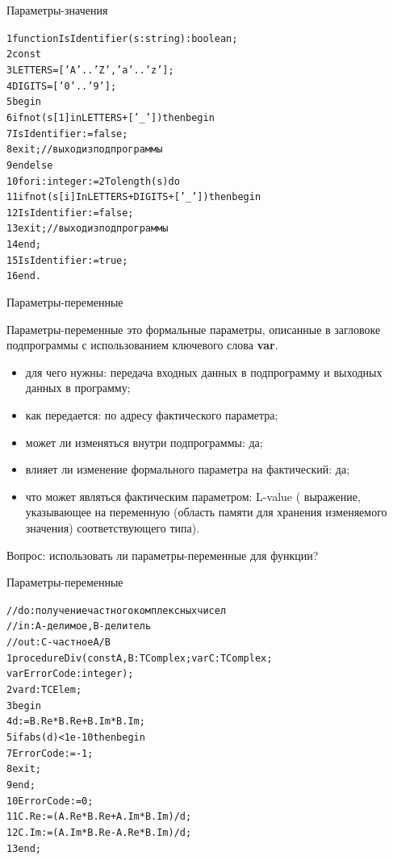 \documentclass{beamer}
\begin{document}
\begin{frame}[fragile]{Параметры-значения}
\begin{alltt}
1 function IsIdentifier(s: string): boolean;
2 const 
3   LETTERS = ['A'..'Z', 'a'..'z'];
4   DIGITS = ['0'..'9'];
5 begin
6   if not (s[1] in LETTERS + ['_']) then begin
7     IsIdentifier := false;
8     exit; //выход из подпрограммы
9   end else	
10   for i: integer := 2 To length(s) do
11     if not (s[i] In LETTERS + DIGITS + ['_']) then begin
12        IsIdentifier := false;
13        exit; //выход из подпрограммы
14     end;
15   IsIdentifier := true;
16 end.
\end{alltt}
\end{frame}

\begin{frame}[fragile]{Параметры-переменные}
\begin{block}{Параметры-переменные}
это формальные параметры, описанные в загловоке подпрограммы с использованием ключевого слова \textbf{var}.
\end{block}
\begin{itemize}
\item для чего нужны: передача входных данных в подпрограмму и выходных данных в программу;
\item как передается: по адресу фактического параметра;
\item может ли изменяться внутри подпрограммы: да;
\item влияет ли изменение формального параметра на фактический: да;
\item что может являться фактическим параметром: L-value ( выражение, указывающее на переменную (область памяти для хранения изменяемого значения) соответствующего типа).
\end{itemize}
Вопрос: использовать ли параметры-переменные для функции?
\end{frame}

\begin{frame}[fragile]{Параметры-переменные}
\begin{alltt}
//do: получение частного комплексных чисел
//in: A - делимое, B - делитель
//out: С - частное A / B
1 procedure Div(const A, B: TComplex; var C: TComplex; 
    var ErrorCode: integer);
2  var d: TCElem;
3  begin
4    d := B.Re * B.Re + B.Im * B.Im;
5    if abs(d) < 1e-10 then begin
7      ErrorCode := -1;
8      exit;
9    end;
10   ErrorCode := 0;
11   C.Re := (A.Re * B.Re + A.Im * B.Im) / d;
12   C.Im := (A.Im * B.Re - A.Re * B.Im) / d;
13 end;	
\end{alltt}
\end{frame}
\end{document}
